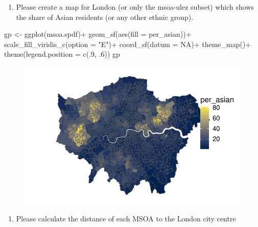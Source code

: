 \documentclass[
  letterpaper,
  DIV=11,
  numbers=noendperiod]{scrreprt}
\newenvironment{Shaded}{\begin{snugshade}}{\end{snugshade}}
\newcommand{\AttributeTok}[1]{\textcolor[rgb]{0.40,0.45,0.13}{#1}}
\newcommand{\ConstantTok}[1]{\textcolor[rgb]{0.56,0.35,0.01}{#1}}
\newcommand{\DecValTok}[1]{\textcolor[rgb]{0.68,0.00,0.00}{#1}}
\newcommand{\FunctionTok}[1]{\textcolor[rgb]{0.28,0.35,0.67}{#1}}
\newcommand{\NormalTok}[1]{\textcolor[rgb]{0.00,0.23,0.31}{#1}}
\newcommand{\OtherTok}[1]{\textcolor[rgb]{0.00,0.23,0.31}{#1}}
\newcommand{\SpecialCharTok}[1]{\textcolor[rgb]{0.37,0.37,0.37}{#1}}
\newcommand{\StringTok}[1]{\textcolor[rgb]{0.13,0.47,0.30}{#1}}
\providecommand{\tightlist}{%
  \setlength{\itemsep}{0pt}\setlength{\parskip}{0pt}}\usepackage{longtable,booktabs,array}
\begin{document}
\begin{enumerate}
\def\labelenumi{\arabic{enumi})}
\setcounter{enumi}{2}
\tightlist
\item
  Please create a map for London (or only the msoa-ulez subset) which
  shows the share of Asian residents (or any other ethnic group).
\end{enumerate}

\begin{Shaded}
\begin{Highlighting}[]
\NormalTok{gp }\OtherTok{\textless{}{-}} \FunctionTok{ggplot}\NormalTok{(msoa.spdf)}\SpecialCharTok{+}
    \FunctionTok{geom\_sf}\NormalTok{(}\FunctionTok{aes}\NormalTok{(}\AttributeTok{fill =}\NormalTok{ per\_asian))}\SpecialCharTok{+}
    \FunctionTok{scale\_fill\_viridis\_c}\NormalTok{(}\AttributeTok{option =} \StringTok{"E"}\NormalTok{)}\SpecialCharTok{+}
    \FunctionTok{coord\_sf}\NormalTok{(}\AttributeTok{datum =} \ConstantTok{NA}\NormalTok{)}\SpecialCharTok{+}
    \FunctionTok{theme\_map}\NormalTok{()}\SpecialCharTok{+}
    \FunctionTok{theme}\NormalTok{(}\AttributeTok{legend.position =} \FunctionTok{c}\NormalTok{(.}\DecValTok{9}\NormalTok{, .}\DecValTok{6}\NormalTok{))}
\NormalTok{gp}
\end{Highlighting}
\end{Shaded}

\begin{figure}[H]

{\centering \includegraphics{02_spatial-data_files/figure-pdf/unnamed-chunk-25-1.pdf}

}

\end{figure}

\begin{enumerate}
\def\labelenumi{\arabic{enumi})}
\setcounter{enumi}{3}
\tightlist
\item
  Please calculate the distance of each MSOA to the London city centre
\end{enumerate}
\end{document}
